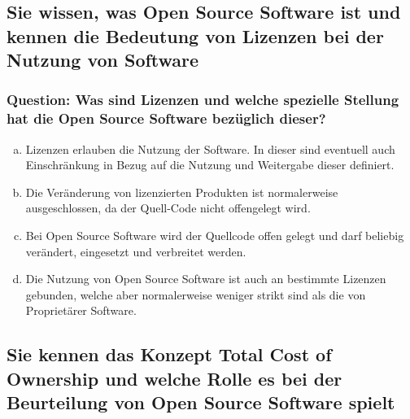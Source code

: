 \documentclass{article}
\begin{document}
\begin{adjustwidth}{2em}{2em}
\begin{adjustwidth}{2em}{2em}
			\subsection{Sie wissen, was Open Source Software ist und kennen die Bedeutung von Lizenzen bei der Nutzung von Software}
			\begin{adjustwidth}{1em}{}
				\subsubsection*{Question: Was sind Lizenzen und welche spezielle Stellung hat die Open Source Software bezüglich dieser?}
				\begin{adjustwidth}{1em}{}
					\begin{enumerate}[(a)]
						\item Lizenzen erlauben die Nutzung der Software. In dieser sind eventuell auch Einschränkung in Bezug auf die Nutzung und Weitergabe dieser definiert.
						\item Die Veränderung von lizenzierten Produkten ist normalerweise ausgeschlossen, da der Quell-Code nicht offengelegt wird.
						\item Bei Open Source Software wird der Quellcode offen gelegt und darf beliebig verändert, eingesetzt und verbreitet werden.
						\item Die Nutzung von Open Source Software ist auch an bestimmte Lizenzen gebunden, welche aber normalerweise weniger strikt sind als die von Proprietärer Software.
					\end{enumerate}
				\end{adjustwidth}
			\end{adjustwidth}
			\subsection{Sie kennen das Konzept Total Cost of Ownership und welche Rolle es bei der Beurteilung von Open Source Software spielt}
			\begin{adjustwidth}{1em}{}

\end{adjustwidth}
\end{adjustwidth}
\end{adjustwidth}
\end{document}
